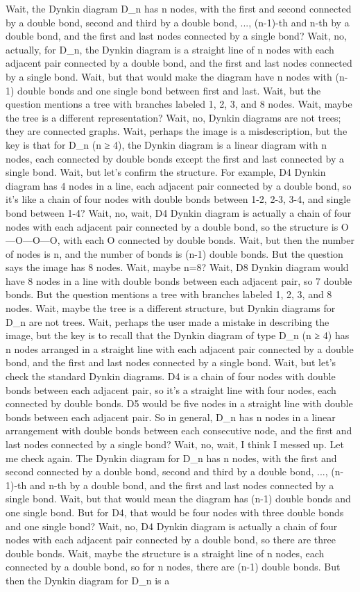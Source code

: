 Wait, the Dynkin diagram D_n has n nodes, with the first and second connected by a double bond, second and third by a double bond, ..., (n-1)-th and n-th by a double bond, and the first and last nodes connected by a single bond? Wait, no, actually, for D_n, the Dynkin diagram is a straight line of n nodes with each adjacent pair connected by a double bond, and the first and last nodes connected by a single bond. Wait, but that would make the diagram have n nodes with (n-1) double bonds and one single bond between first and last. Wait, but the question mentions a tree with branches labeled 1, 2, 3, and 8 nodes. Wait, maybe the tree is a different representation? Wait, no, Dynkin diagrams are not trees; they are connected graphs. Wait, perhaps the image is a misdescription, but the key is that for D_n (n ≥ 4), the Dynkin diagram is a linear diagram with n nodes, each connected by double bonds except the first and last connected by a single bond. Wait, but let's confirm the structure. For example, D4 Dynkin diagram has 4 nodes in a line, each adjacent pair connected by a double bond, so it's like a chain of four nodes with double bonds between 1-2, 2-3, 3-4, and single bond between 1-4? Wait, no, wait, D4 Dynkin diagram is actually a chain of four nodes with each adjacent pair connected by a double bond, so the structure is O---O---O---O, with each O connected by double bonds. Wait, but then the number of nodes is n, and the number of bonds is (n-1) double bonds. But the question says the image has 8 nodes. Wait, maybe n=8? Wait, D8 Dynkin diagram would have 8 nodes in a line with double bonds between each adjacent pair, so 7 double bonds. But the question mentions a tree with branches labeled 1, 2, 3, and 8 nodes. Wait, maybe the tree is a different structure, but Dynkin diagrams for D_n are not trees. Wait, perhaps the user made a mistake in describing the image, but the key is to recall that the Dynkin diagram of type D_n (n ≥ 4) has n nodes arranged in a straight line with each adjacent pair connected by a double bond, and the first and last nodes connected by a single bond. Wait, but let's check the standard Dynkin diagrams. D4 is a chain of four nodes with double bonds between each adjacent pair, so it's a straight line with four nodes, each connected by double bonds. D5 would be five nodes in a straight line with double bonds between each adjacent pair. So in general, D_n has n nodes in a linear arrangement with double bonds between each consecutive node, and the first and last nodes connected by a single bond? Wait, no, wait, I think I messed up. Let me check again. The Dynkin diagram for D_n has n nodes, with the first and second connected by a double bond, second and third by a double bond, ..., (n-1)-th and n-th by a double bond, and the first and last nodes connected by a single bond. Wait, but that would mean the diagram has (n-1) double bonds and one single bond. But for D4, that would be four nodes with three double bonds and one single bond? Wait, no, D4 Dynkin diagram is actually a chain of four nodes with each adjacent pair connected by a double bond, so there are three double bonds. Wait, maybe the structure is a straight line of n nodes, each connected by a double bond, so for n nodes, there are (n-1) double bonds. But then the Dynkin diagram for D_n is a 